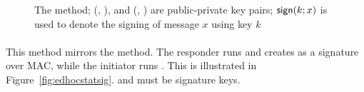 \begin{figure}[h]
{}
    \caption{The \mSigStat{} method; (\mCredi{}, \mLtki), and
        (\mCredr{}, \mLtkr{}) are public-private key pairs; $\textsf{sign}(k; x)$ is
    used to denote the signing of message $x$ using key $k$}
\label{fig:edhocsigstat}
\end{figure}
%

\paragraph{\mStatSig}
This method mirrors the \mSigStat{} method.
%
The responder runs \mSig{} and creates \mAuthr{} as a signature over MAC,
while the initiator runs \mStat{}.
%
This is illustrated in Figure~\ref{fig:edhocstatsig}. \mCredr{} and \mLtkr{}
must be signature keys.
%

